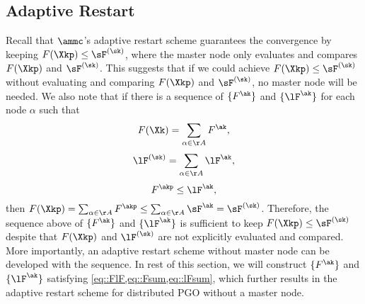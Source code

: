 \subsection{Adaptive Restart}\label{subsection::amm::restart}
{ 
Recall that $\ammc$'s adaptive restart scheme guarantees the convergence by keeping $F(\Xkp)\leq \sF^{(\sk)}$, where the master node only evaluates and compares $F(\Xkp)$ and  $\sF^{(\sk)}$. This suggests that if we could achieve $F(\Xkp)\leq \sF^{(\sk)}$ without evaluating and comparing $F(\Xkp)$ and  $\sF^{(\sk)}$, no master node will be needed. We also  note that if there is a sequence of $\{F^{\ak}\}$ and $\{\lF^{\ak}\}$  for each node $\alpha$ such that
\begin{equation}\label{eq::Fsum}
F(\Xk) = \sum_{\alpha\in\AA} F^{\ak},
\end{equation}
\begin{equation}\label{eq::lFsum}
	\lF^{(\sk)} = \sum_{\alpha\in\AA} \lF^{\ak},
\end{equation}
\begin{equation}\label{eq::FlF}
	F^{\akp} \leq \lF^{\ak},
\end{equation}
then $F(\Xkp)=\sum_{\alpha\in\AA}F^{\akp}\leq \sum_{\alpha\in\AA}\sF^{\ak}=\sF^{(\sk)}$. Therefore,  the sequence above of $\{F^{\ak}\}$ and $\{\lF^{\ak}\}$  is sufficient to  keep $F(\Xkp)\leq \sF^{(\sk)}$  despite that $F(\Xkp)$ and $\lF^{(\sk)}$ are not explicitly evaluated and compared. More importantly, an adaptive restart scheme without master node can be developed with the sequence.  In rest of this section, we will construct  $\{F^{\ak}\}$ and $\{\lF^{\ak}\}$  satisfying \cref{eq::FlF,eq::Fsum,eq::lFsum},  which further results in the adaptive restart scheme for distributed PGO without a master node. }

